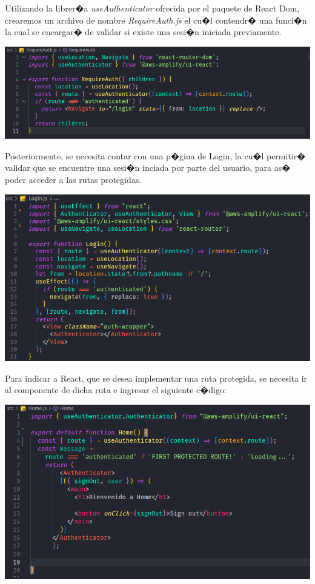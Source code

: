 \documentclass[12pt,letterpaper]{article}
\begin{document}
Utilizando la librer�a \emph{useAuthenticator} ofrecida por el paquete de React Dom, crearemos un archivo de nombre \emph{RequireAuth.js} el cu�l contendr� una funci�n la cual se encargar� de validar si existe una sesi�n iniciada previamente.

\begin{center}
  \includegraphics[scale=0.5]{imagenes/auth}
 \label{fig:auth} 
\end{center} 

Posteriormente, se necesita contar con una p�gina de Login, la cu�l permitir� validar que se encuentre una sesi�n inciada por parte del usuario, para as� poder acceder a las rutas protegidas.

\begin{center}
  \includegraphics[scale=0.6]{imagenes/loginjs}
 \label{fig:loginjs} 
\end{center} 


Para indicar a React, que se desea implementar una ruta protegida, se necesita ir al componente de dicha ruta e ingresar el siguiente c�digo:


\begin{center}
  \includegraphics[scale=0.5]{imagenes/homejs}
 \label{fig:homejs} 
\end{center} 
\end{document}
